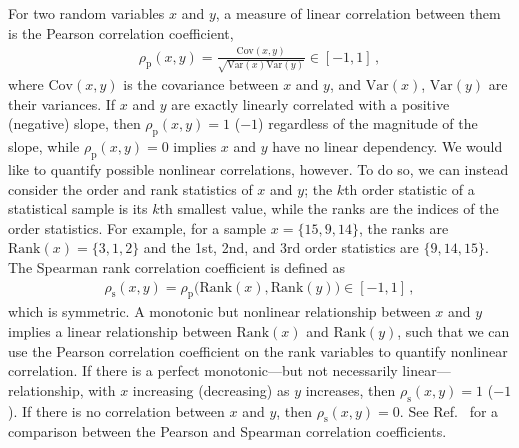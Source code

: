 \begin{refsection}
For two random variables $x$ and $y$, a measure of linear correlation between them is the Pearson correlation coefficient,
\begin{align}
\rho_\mathrm{p} ( x , y )
=
\frac
{ \mathrm{Cov}(x,y) }
{ \sqrt{ \mathrm{Var}(x) \mathrm{Var}(y) } }
\in
[ -1 , 1 ]
\, ,
\label{eq: Pearson}
\end{align}
where $\mathrm{Cov}(x,y)$ is the covariance between $x$ and $y$, and $\mathrm{Var}(x)$, $\mathrm{Var}(y)$ are their variances. If $x$ and $y$ are exactly linearly correlated with a positive (negative) slope, then $\rho_\mathrm{p}(x,y) = 1$ ($-1$) regardless of the magnitude of the slope, while $\rho_\mathrm{p}(x,y)=0$ implies $x$ and $y$ have no linear dependency. We would like to quantify possible nonlinear correlations, however. To do so, we can instead consider the order and rank statistics of $x$ and $y$; the $k$th order statistic of a statistical sample is its $k$th smallest value, while the ranks are the indices of the order statistics. For example, for a sample $x=\{15,9,14\}$, the ranks are $\mathrm{Rank}(x)=\{3,1,2\}$ and the 1st, 2nd, and 3rd order statistics are $\{9,14,15\}$. The Spearman rank correlation coefficient \cite{Spearman:1904abc, kendall1979advanced, Schweizer1981} is defined as
\begin{align}
\rho_\mathrm{s} ( x , y )
=
\rho_\mathrm{p} \big( \mathrm{Rank}(x) , \mathrm{Rank}(y) \big)
\in
[ -1 , 1 ]
\, ,
\label{eq: Spearman}
\end{align}
which is symmetric. A monotonic but nonlinear relationship between $x$ and $y$ implies a linear relationship between $\mathrm{Rank}(x)$ and $\mathrm{Rank}(y)$, such that we can use the Pearson correlation coefficient on the rank variables to quantify nonlinear correlation. If there is a perfect monotonic---but not necessarily linear---relationship, with $x$ increasing (decreasing) as $y$ increases, then $\rho_\mathrm{s}(x,y)=1$ ($-1$). If there is no correlation between $x$ and $y$, then $\rho_\mathrm{s}(x,y)=0$. See Ref.~\cite{Hauke:2011abc} for a comparison between the Pearson and Spearman correlation coefficients.


\end{refsection}

